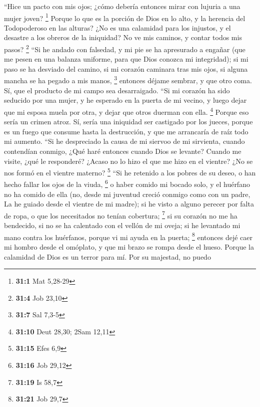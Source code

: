 \begin{paracol}{2}
 ``Hice un pacto con mis ojos; ¿cómo debería entonces
mirar con lujuria a una mujer joven? \footnote{\textbf{31:1} Mat 5,28-29}
 Porque lo que es la porción de Dios en lo alto, y la
herencia del Todopoderoso en las alturas?  ¿No es una
calamidad para los injustos, y el desastre a los obreros de la
iniquidad?  No ve mis caminos, y contar todos mis pasos?
\footnote{\textbf{31:4} Job 23,10}  ``Si he andado con
falsedad, y mi pie se ha apresurado a engañar  (que me
pesen en una balanza uniforme, para que Dios conozca mi integridad);
 si mi paso se ha desviado del camino, si mi corazón
caminara tras mis ojos, si alguna mancha se ha pegado a mis manos,
\footnote{\textbf{31:7} Sal 7,3-5}  entonces déjame
sembrar, y que otro coma. Sí, que el producto de mi campo sea
desarraigado.  ``Si mi corazón ha sido seducido por una
mujer, y he esperado en la puerta de mi vecino,  y luego
dejar que mi esposa muela por otra, y dejar que otros duerman con ella.
\footnote{\textbf{31:10} Deut 28,30; 2Sam 12,11}  Porque
eso sería un crimen atroz. Sí, sería una iniquidad ser castigado por los
jueces,  porque es un fuego que consume hasta la
destrucción, y que me arrancaría de raíz todo mi aumento.
 ``Si he despreciado la causa de mi siervoo de mi
sirvienta, cuando contendían conmigo,  ¿Qué haré entonces
cuando Dios se levante? Cuando me visite, ¿qué le responderé?
 ¿Acaso no lo hizo el que me hizo en el vientre? ¿No se
nos formó en el vientre materno? \footnote{\textbf{31:15} Efes 6,9}
 ``Si he retenido a los pobres de su deseo, o han hecho
fallar los ojos de la viuda, \footnote{\textbf{31:16} Job 29,12}
 o haber comido mi bocado solo, y el huérfano no ha
comido de ella  (no, desde mi juventud creció conmigo
como con un padre, La he guiado desde el vientre de mi madre);
 si he visto a alguno perecer por falta de ropa, o que
los necesitados no tenían cobertura; \footnote{\textbf{31:19} Is 58,7}
 si su corazón no me ha bendecido, si no se ha calentado
con el vellón de mi oveja;  si he levantado mi mano
contra los huérfanos, porque vi mi ayuda en la puerta; \footnote{\textbf{31:21}
  Job 29,7}  entonces dejé caer mi hombro desde el
omóplato, y que mi brazo se rompa desde el hueso.  Porque
la calamidad de Dios es un terror para mí. Por su majestad, no puedo

\end{paracol}
